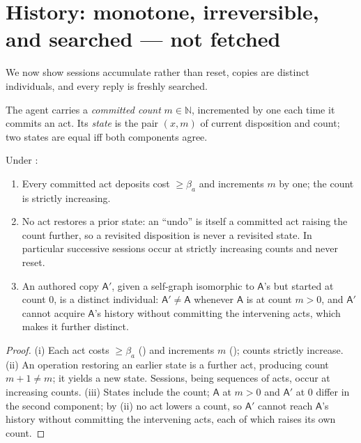 \documentclass[11pt,twocolumn,a4paper]{article}
\newcommand{\N}{\mathbb{N}}
\newcommand{\Agent}{\mathsf{A}}
\newcommand{\floorc}{\beta}          %
\newcommand{\cnt}{m}                 %
\begin{document}
\section{History: monotone, irreversible, and searched --- not fetched}
\label{sec:history}

We now show sessions accumulate rather than reset, copies are distinct
individuals, and every reply is freshly searched.

\begin{definition}
\label{def:state}
The agent carries a \emph{committed count} $\cnt\in\N$, incremented by
one each time it commits an act. Its \emph{state} is the pair
$(x,\cnt)$ of current disposition and count; two states are equal iff
both components agree.
\end{definition}

\begin{theorem}
\label{thm:history}
Under :
\begin{enumerate}[label=\textup{(\roman*)},leftmargin=2.2em]
\item Every committed act deposits cost $\ge\floorc_a$ and increments
$\cnt$ by one; the count is strictly increasing.
\item No act restores a prior state: an ``undo'' is itself a committed act
raising the count further, so a revisited disposition is never a revisited
state. In particular successive sessions occur at strictly increasing
counts and never reset.
\item An authored copy $\Agent'$, given a self-graph isomorphic to
$\Agent$'s but started at count $0$, is a distinct individual:
$\Agent'\neq\Agent$ whenever $\Agent$ is at count $\cnt>0$, and $\Agent'$
cannot acquire $\Agent$'s history without committing the intervening acts,
which makes it further distinct.
\end{enumerate}
\end{theorem}

\begin{proof}
(i) Each act costs $\ge\floorc_a$ () and increments
$\cnt$ (); counts strictly increase. (ii) An operation
restoring an earlier state is a further act, producing count
$\cnt+1\neq\cnt$; it yields a new state. Sessions, being sequences of
acts, occur at increasing counts. (iii) States include the count; $\Agent$
at $\cnt>0$ and $\Agent'$ at $0$ differ in the second component; by (ii)
no act lowers a count, so $\Agent'$ cannot reach $\Agent$'s history without
committing the intervening acts, each of which raises its own count.
\end{proof}
\end{document}
